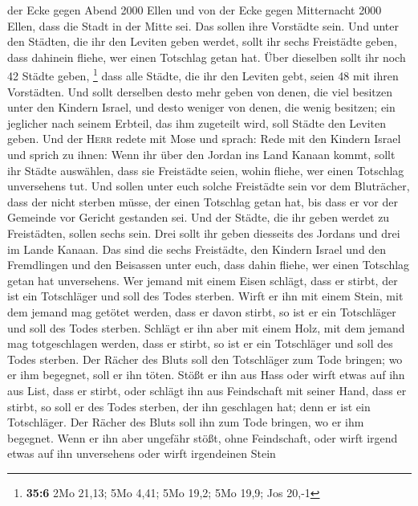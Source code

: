 der Ecke gegen Abend 2000 Ellen und von der Ecke gegen Mitternacht 2000
Ellen, dass die Stadt in der Mitte sei. Das sollen ihre Vorstädte sein.
 Und unter den Städten, die ihr den Leviten geben werdet,
sollt ihr sechs Freistädte geben, dass dahinein fliehe, wer einen
Totschlag getan hat. Über dieselben sollt ihr noch 42 Städte geben,
\footnote{\textbf{35:6} 2Mo 21,13; 5Mo 4,41; 5Mo 19,2; 5Mo 19,9; Jos
  20,-1}  dass alle Städte, die ihr den Leviten gebt,
seien 48 mit ihren Vorstädten.  Und sollt derselben desto
mehr geben von denen, die viel besitzen unter den Kindern Israel, und
desto weniger von denen, die wenig besitzen; ein jeglicher nach seinem
Erbteil, das ihm zugeteilt wird, soll Städte den Leviten geben.
 Und der \textsc{Herr} redete mit Mose und sprach:
 Rede mit den Kindern Israel und sprich zu ihnen: Wenn
ihr über den Jordan ins Land Kanaan kommt,  sollt ihr
Städte auswählen, dass sie Freistädte seien, wohin fliehe, wer einen
Totschlag unversehens tut.  Und sollen unter euch solche
Freistädte sein vor dem Bluträcher, dass der nicht sterben müsse, der
einen Totschlag getan hat, bis dass er vor der Gemeinde vor Gericht
gestanden sei.  Und der Städte, die ihr geben werdet zu
Freistädten, sollen sechs sein.  Drei sollt ihr geben
diesseits des Jordans und drei im Lande Kanaan.  Das sind
die sechs Freistädte, den Kindern Israel und den Fremdlingen und den
Beisassen unter euch, dass dahin fliehe, wer einen Totschlag getan hat
unversehens.  Wer jemand mit einem Eisen schlägt, dass er
stirbt, der ist ein Totschläger und soll des Todes sterben.
 Wirft er ihn mit einem Stein, mit dem jemand mag getötet
werden, dass er davon stirbt, so ist er ein Totschläger und soll des
Todes sterben.  Schlägt er ihn aber mit einem Holz, mit
dem jemand mag totgeschlagen werden, dass er stirbt, so ist er ein
Totschläger und soll des Todes sterben.  Der Rächer des
Bluts soll den Totschläger zum Tode bringen; wo er ihm begegnet, soll er
ihn töten.  Stößt er ihn aus Hass oder wirft etwas auf
ihn aus List, dass er stirbt,  oder schlägt ihn aus
Feindschaft mit seiner Hand, dass er stirbt, so soll er des Todes
sterben, der ihn geschlagen hat; denn er ist ein Totschläger. Der Rächer
des Bluts soll ihn zum Tode bringen, wo er ihm begegnet. 
Wenn er ihn aber ungefähr stößt, ohne Feindschaft, oder wirft irgend
etwas auf ihn unversehens  oder wirft irgendeinen Stein
